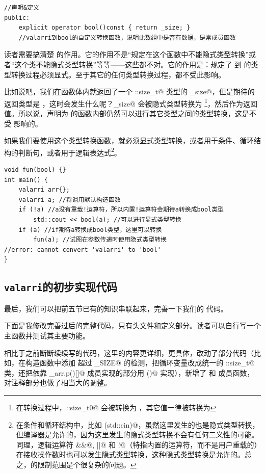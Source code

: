 \begin{lstlisting}
//声明&定义
public:
    explicit operator bool()const { return _size; }
    //valarri到bool的自定义转换函数，说明此数组中是否有数据，是常成员函数
\end{lstlisting}\par
读者需要搞清楚 \lstinline@explicit@ 的作用。它的作用不是``规定在这个函数中不能隐式类型转换''或者``这个类不能隐式类型转换''等等——这些都不对。它的作用是：规定了 \lstinline@valarri@ 到 \lstinline@bool@ 的类型转换过程必须显式。至于其它的任何类型转换过程，都不受此影响。\par
比如说吧，我们在函数体内就返回了一个 \lstinline@std::size_t@ 类型的 \lstinline@_size@，但是期待的返回类型是 \lstinline@bool@，这时会发生什么呢？\lstinline@_size@ 会被隐式类型转换为 \lstinline@bool@\footnote{在转换过程中，\lstinline@std::size_t{0}@ 会被转换为 \lstinline@false@，其它值一律被转换为 \lstinline@true@}，然后作为返回值。所以说，声明为 \lstinline@explicit@ 的函数内部仍然可以进行其它类型之间的类型转换，这是不受 \lstinline@explicit@ 影响的。\par
如果我们要使用这个类型转换函数，就必须显式类型转换，或者用于条件、循环结构的判断句，或者用于逻辑表达式\footnote{在条件和循环结构中，比如 \lstinline@if(std::cin)@，虽然这里发生的也是隐式类型转换，但编译器是允许的，因为这里发生的隐式类型转换不会有任何二义性的可能。同理，逻辑运算符 \lstinline@&&@, \lstinline@||@ 和 \lstinline@!@（特指内置的运算符，而不是用户重载的）在接收操作数时也可以发生隐式类型转换，这种隐式类型转换是允许的。总之，\lstinline@explicit@ 的限制范围是个很复杂的问题。}。
\begin{lstlisting}
void fun(bool) {}
int main() {
    valarri arr{};
    valarri a; //将调用默认构造函数
    if (!a) //a没有重载!运算符，所以内置!运算符会期待a转换成bool类型
        std::cout << bool(a); //可以进行显式类型转换
    if (a) //if期待a转换成bool类型，这里可以转换
        fun(a); //试图在参数传递时使用隐式类型转换
//error: cannot convert 'valarri' to 'bool'
}
\end{lstlisting}
\subsection*{\texttt{valarri}的初步实现代码}
最后，我们可以把前五节已有的知识串联起来，完善一下我们的 \lstinline@valarri@ 代码。\par
下面是我修改完善过后的完整代码，只有头文件和定义部分。读者可以自行写一个主函数并测试其主要功能。\par
相比于之前断断续续写的代码，这里的内容更详细，更具体，改动了部分代码（比如，在构造函数中添加 \lstinline@size@ 超过 \lstinline@MAX_SIZE@ 的检测，把循环变量改成统一的 \lstinline@std::size_t@ 类，还把依靠 \lstinline@_arr.p()[]@ 成员实现的部分用 \lstinline@operator[]()@ 实现），新增了 \lstinline@resize@ 和 \lstinline@swap@ 成员函数，对注释部分也做了相当大的调整。


